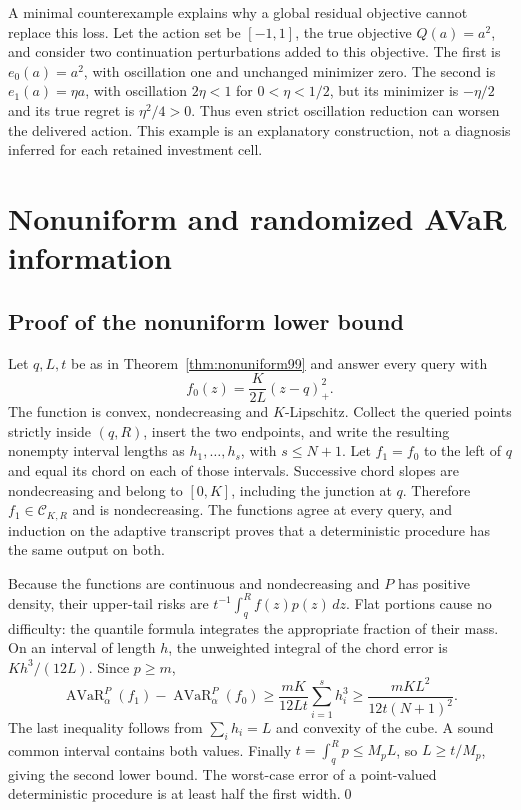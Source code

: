 A minimal counterexample explains why a global residual objective cannot replace this loss. Let the action set be $[-1,1]$, the true objective $Q(a)=a^2$, and consider two continuation perturbations added to this objective. The first is $e_0(a)=a^2$, with oscillation one and unchanged minimizer zero. The second is $e_1(a)=\eta a$, with oscillation $2\eta<1$ for $0<\eta<1/2$, but its minimizer is $-\eta/2$ and its true regret is $\eta^2/4>0$. Thus even strict oscillation reduction can worsen the delivered action. This example is an explanatory construction, not a diagnosis inferred for each retained investment cell.

\section{Nonuniform and randomized AVaR information}\label{supp:information99}
\subsection{Proof of the nonuniform lower bound}
Let $q,L,t$ be as in Theorem~\ref{thm:nonuniform99} and answer every query with
\[
 f_0(z)=\frac{K}{2L}(z-q)_+^2.
\]
The function is convex, nondecreasing and $K$-Lipschitz. Collect the queried points strictly inside $(q,R)$, insert the two endpoints, and write the resulting nonempty interval lengths as $h_1,\ldots,h_s$, with $s\le N+1$. Let $f_1=f_0$ to the left of $q$ and equal its chord on each of those intervals. Successive chord slopes are nondecreasing and belong to $[0,K]$, including the junction at $q$. Therefore $f_1\in\mathcal C_{K,R}$ and is nondecreasing. The functions agree at every query, and induction on the adaptive transcript proves that a deterministic procedure has the same output on both.

Because the functions are continuous and nondecreasing and $P$ has positive density, their upper-tail risks are $t^{-1}\int_q^R f(z)p(z)\,dz$. Flat portions cause no difficulty: the quantile formula integrates the appropriate fraction of their mass. On an interval of length $h$, the unweighted integral of the chord error is $Kh^3/(12L)$. Since $p\ge m$,
\[
 \operatorname{AVaR}_\alpha^P(f_1)-\operatorname{AVaR}_\alpha^P(f_0)
 \ge\frac{mK}{12Lt}\sum_{i=1}^s h_i^3
 \ge\frac{mKL^2}{12t(N+1)^2}.
\]
The last inequality follows from $\sum_i h_i=L$ and convexity of the cube. A sound common interval contains both values. Finally $t=\int_q^R p\le M_pL$, so $L\ge t/M_p$, giving the second lower bound. The worst-case error of a point-valued deterministic procedure is at least half the first width.\qed

